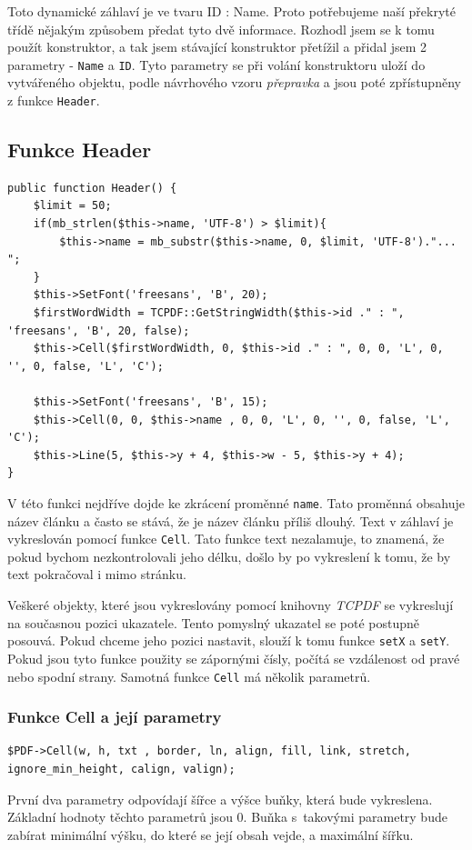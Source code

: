 \documentclass[czech,BP]{thesiskiv}
\begin{document}
Toto dynamické záhlaví je ve tvaru ID : Name. Proto potřebujeme naší překryté třídě nějakým způsobem předat tyto dvě informace. Rozhodl jsem se k tomu použít konstruktor, a tak jsem stávající konstruktor přetížil a přidal jsem 2 parametry - \texttt{Name} a \texttt{ID}. Tyto parametry se při volání konstruktoru uloží do vytvářeného objektu, podle návrhového vzoru \emph{přepravka} a jsou poté zpřístupněny z funkce \texttt{Header}.
\subsection{Funkce Header}
\label{lst:Header}
\begin{lstlisting}
public function Header() {
	$limit = 50;
	if(mb_strlen($this->name, 'UTF-8') > $limit){
		$this->name = mb_substr($this->name, 0, $limit, 'UTF-8')."... ";
	} 
	$this->SetFont('freesans', 'B', 20);
	$firstWordWidth = TCPDF::GetStringWidth($this->id ." : ", 'freesans', 'B', 20, false);
	$this->Cell($firstWordWidth, 0, $this->id ." : ", 0, 0, 'L', 0, '', 0, false, 'L', 'C');
	
	$this->SetFont('freesans', 'B', 15);
	$this->Cell(0, 0, $this->name , 0, 0, 'L', 0, '', 0, false, 'L', 'C');
	$this->Line(5, $this->y + 4, $this->w - 5, $this->y + 4);
}
\end{lstlisting}
V této funkci nejdříve dojde ke zkrácení proměnné \texttt{name}. Tato proměnná obsahuje název článku a často se stává, že je název článku příliš dlouhý. Text v záhlaví je vykreslován pomocí funkce \texttt{Cell}. Tato funkce text nezalamuje, to znamená, že pokud bychom nezkontrolovali jeho délku, došlo by po vykreslení k tomu, že by text pokračoval i mimo stránku. 

Veškeré objekty, které jsou vykreslovány pomocí knihovny \emph{TCPDF} se vykreslují na současnou pozici ukazatele. Tento pomyslný ukazatel se poté postupně posouvá. Pokud chceme jeho pozici nastavit, slouží k tomu funkce \texttt{setX} a \texttt{setY}. Pokud jsou tyto funkce použity se zápornými čísly, počítá se vzdálenost od pravé nebo spodní strany. Samotná funkce \texttt{Cell} má několik parametrů. 
\subsubsection{Funkce Cell a její parametry}
\begin{lstlisting}
$PDF->Cell(w, h, txt , border, ln, align, fill, link, stretch, ignore_min_height, calign, valign);
\end{lstlisting}
První dva parametry odpovídají šířce a výšce buňky, která bude vykreslena. Základní hodnoty těchto parametrů jsou 0. Buňka s~takovými parametry bude zabírat minimální výšku, do které se její obsah vejde, a maximální šířku. 
\end{document}
